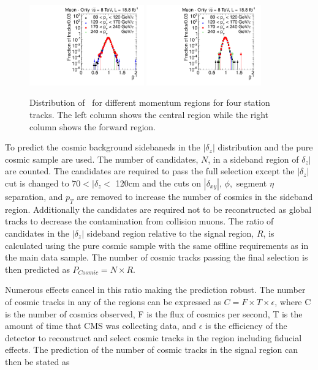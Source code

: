 \begin{figure}
\begin{center}
\includegraphics[clip=true, trim=0.0cm 0cm 3.0cm 0cm,width=0.44\textwidth]{figures/muonly/Control_Data8TeV_Pt_TOFSpectrum_Binned_2}
\includegraphics[clip=true, trim=0.0cm 0cm 3.0cm 0cm,width=0.44\textwidth]{figures/muonly/Control_Data8TeV_Pt_TOFSpectrum_Binned_5}
\caption{Distribution of \invbeta\
for different momentum regions for four station tracks.
The  left column shows the central region while the right column
shows the forward region.
\label{fig:MuOnlyControl4}}
\end{center}
\end{figure}

To predict the cosmic background sidebaneds in the $|\delta_z|$ distribution and the pure cosmic sample are used. The number of candidates, $N$, 
in a sideband region of $\delta_z|$ are counted. The candidates are required to pass the full selection except the $|\delta_z|$ cut is changed to $70 < |\delta_z <$ 120cm and
the cuts on $|\delta_{xy}|$, $\phi,$ segment $\eta$ separation, and $p_T$ are removed to increase the number of cosmics in the sideband region. Additionally the candidates
are required not to be reconstructed as global tracks to decrease the contamination from collision muons. The ratio of candidates in the $|\delta_z|$ sideband region 
relative to the signal region, $R$, is calculated using the pure cosmic sample with the same offline requirements as in the main data sample. The number of cosmic tracks
passing the final selection is then predicted as $P_{Cosmic} = N \times R$.

Numerous effects cancel in this ratio making the prediction robust. The number of cosmic tracks in any of the regions can be expressed as 
$C = F \times T \times \epsilon$, where C is the number of cosmics observed, F is the flux of cosmics per second, T is the amount of time that CMS was collecting data,
and $\epsilon$ is the efficiency of the detector to reconstruct and select cosmic tracks in the region including fiducial effects. 
The prediction of the number of cosmic tracks in the signal region can then be stated as 

